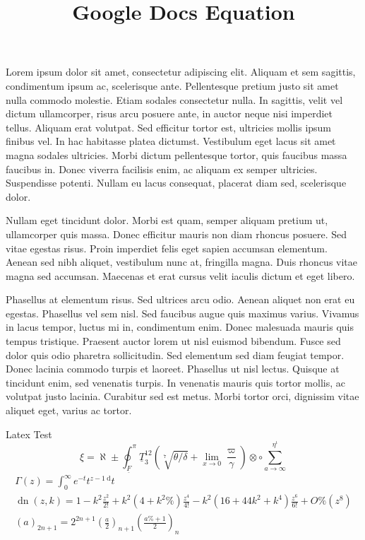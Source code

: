 \documentclass[10pt]{article}
\title{Google Docs Equation }
\author{}
\date{}
\begin{document}
\maketitle
Lorem ipsum dolor sit amet, consectetur adipiscing elit. Aliquam et sem sagittis, condimentum ipsum ac, scelerisque ante. Pellentesque pretium justo sit amet nulla commodo molestie. Etiam sodales consectetur nulla. In sagittis, velit vel dictum ullamcorper, risus arcu posuere ante, in auctor neque nisi imperdiet tellus. Aliquam erat volutpat. Sed efficitur tortor est, ultricies mollis ipsum finibus vel. In hac habitasse platea dictumst. Vestibulum eget lacus sit amet magna sodales ultricies. Morbi dictum pellentesque tortor, quis faucibus massa faucibus in. Donec viverra facilisis enim, ac aliquam ex semper ultricies. Suspendisse potenti. Nullam eu lacus consequat, placerat diam sed, scelerisque dolor.

Nullam eget tincidunt dolor. Morbi est quam, semper aliquam pretium ut, ullamcorper quis massa. Donec efficitur mauris non diam rhoncus posuere. Sed vitae egestas risus. Proin imperdiet felis eget sapien accumsan elementum. Aenean sed nibh aliquet, vestibulum nunc at, fringilla magna. Duis rhoncus vitae magna sed accumsan. Maecenas et erat cursus velit iaculis dictum et eget libero.

Phasellus at elementum risus. Sed ultrices arcu odio. Aenean aliquet non erat eu egestas. Phasellus vel sem nisl. Sed faucibus augue quis maximus varius. Vivamus in lacus tempor, luctus mi in, condimentum enim. Donec malesuada mauris quis tempus tristique. Praesent auctor lorem ut nisl euismod bibendum. Fusce sed dolor quis odio pharetra sollicitudin. Sed elementum sed diam feugiat tempor. Donec lacinia commodo turpis et laoreet. Phasellus ut nisl lectus. Quisque at tincidunt enim, sed venenatis turpis. In venenatis mauris quis tortor mollis, ac volutpat justo lacinia. Curabitur sed est metus. Morbi tortor orci, dignissim vitae aliquet eget, varius ac tortor.

Latex Test
$$
\xi=\aleph \pm \oint_{\underline{F}}^{\pi} \underline{T}_{3}^{12}\left(\sqrt[7]{\theta / \delta}+\lim _{x \rightarrow 0} \frac{\varpi}{\gamma}\right) \otimes \circ \sum_{a \rightarrow \infty}^{\eta^{\iota}}
$$
$$
\begin{gathered}
\Gamma(z)=\int_{0}^{\infty} e^{-t} t^{z-1 \mathrm{~d}} t \\
\operatorname{dn}(z, k)=1-k^{2} \frac{z^{2}}{2 !}+k^{2}\left(4+k^{2} \%\right) \frac{z^{4}}{4 !}-k^{2}\left(16+44 k^{2}+k^{4}\right) \frac{z^{6}}{6 !}+O \%\left(z^{8}\right) \\
(a)_{2 n+1}=2^{2 n+1}\left(\frac{a}{2}\right)_{n+1}\left(\frac{a \%+1}{2}\right)_{n}
\end{gathered}
$$
\end{document}
